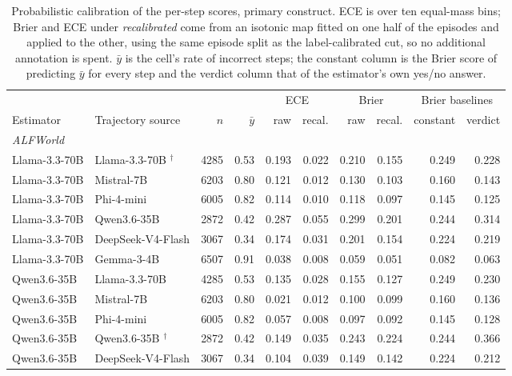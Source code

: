 \begin{table}[t]
\centering
\small
\caption{Probabilistic calibration of the per-step scores, primary construct. ECE is over ten equal-mass bins; Brier and ECE under \emph{recalibrated} come from an isotonic map fitted on one half of the episodes and applied to the other, using the same episode split as the label-calibrated cut, so no additional annotation is spent. $\bar{y}$ is the cell's rate of incorrect steps; the constant column is the Brier score of predicting $\bar{y}$ for every step and the verdict column that of the estimator's own yes/no answer.}
\label{tab:calib}
\begin{tabular}{llrrrrrrrr}
\toprule
& & & & \multicolumn{2}{c}{ECE} & \multicolumn{2}{c}{Brier} & \multicolumn{2}{c}{Brier baselines} \\
\cmidrule(lr){5-6}\cmidrule(lr){7-8}\cmidrule(lr){9-10}
Estimator & Trajectory source & $n$ & $\bar{y}$ & raw & recal. & raw & recal. & constant & verdict \\
\midrule
\multicolumn{10}{l}{\emph{ALFWorld}} \\
Llama-3.3-70B & Llama-3.3-70B $^{\dagger}$ & 4285 & 0.53 & 0.193 & 0.022 & 0.210 & 0.155 & 0.249 & 0.228 \\
Llama-3.3-70B & Mistral-7B & 6203 & 0.80 & 0.121 & 0.012 & 0.130 & 0.103 & 0.160 & 0.143 \\
Llama-3.3-70B & Phi-4-mini & 6005 & 0.82 & 0.114 & 0.010 & 0.118 & 0.097 & 0.145 & 0.125 \\
Llama-3.3-70B & Qwen3.6-35B & 2872 & 0.42 & 0.287 & 0.055 & 0.299 & 0.201 & 0.244 & 0.314 \\
Llama-3.3-70B & DeepSeek-V4-Flash & 3067 & 0.34 & 0.174 & 0.031 & 0.201 & 0.154 & 0.224 & 0.219 \\
Llama-3.3-70B & Gemma-3-4B & 6507 & 0.91 & 0.038 & 0.008 & 0.059 & 0.051 & 0.082 & 0.063 \\
Qwen3.6-35B & Llama-3.3-70B & 4285 & 0.53 & 0.135 & 0.028 & 0.155 & 0.127 & 0.249 & 0.230 \\
Qwen3.6-35B & Mistral-7B & 6203 & 0.80 & 0.021 & 0.012 & 0.100 & 0.099 & 0.160 & 0.136 \\
Qwen3.6-35B & Phi-4-mini & 6005 & 0.82 & 0.057 & 0.008 & 0.097 & 0.092 & 0.145 & 0.128 \\
Qwen3.6-35B & Qwen3.6-35B $^{\dagger}$ & 2872 & 0.42 & 0.149 & 0.035 & 0.243 & 0.224 & 0.244 & 0.366 \\
Qwen3.6-35B & DeepSeek-V4-Flash & 3067 & 0.34 & 0.104 & 0.039 & 0.149 & 0.142 & 0.224 & 0.212 \\

\end{tabular}
\end{table}

